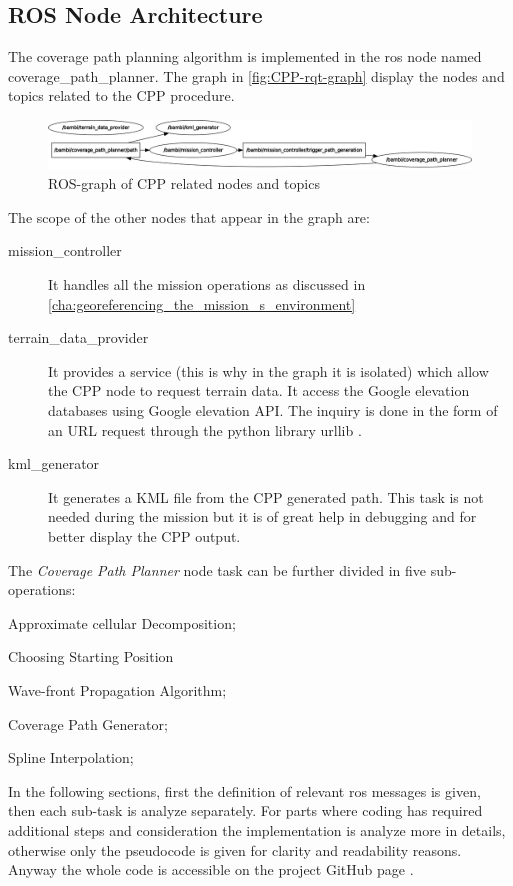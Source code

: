 \subsection{ROS Node Architecture} %
\label{sub:ros_node_architecture}
The coverage path planning algorithm is implemented in the \acrshort{ros} node named \textsf{coverage\_path\_planner}. The graph in \autoref{fig:CPP-rqt-graph} display the nodes and topics related to the CPP procedure.
\begin{figure}[ht]
    \centering
    \includegraphics[width=1\textwidth]{figures/C3/CPP-rqt-graph.png}
    \caption{ROS-graph of CPP related nodes and topics}
    \label{fig:CPP-rqt-graph}
\end{figure}
The scope of the other nodes that appear in the graph are:
\begin{description}
	\item[\textsf{mission\_controller}] It handles all the mission operations as discussed in \autoref{cha:georeferencing_the_mission_s_environment}
	\item[\textsf{terrain\_data\_provider}] It provides a service (this is why in the graph it is isolated) which allow the CPP node to request terrain data. It access the Google elevation databases using Google elevation API. The inquiry is done in the form of an URL request through the python library \textsf{urllib} \cite{urllib}. 
	\item[\textsf{kml\_generator}] It generates a KML file from the CPP generated path. This task is not needed during the mission but it is of great help in debugging and for better display the CPP output.
\end{description}
The \textit{Coverage Path Planner} node task can be further divided in five sub-operations:
\begin{enumerate*}[label={(\arabic*)}]
	\item Approximate cellular Decomposition;
	\item Choosing Starting Position
	\item Wave-front Propagation Algorithm;
	\item Coverage Path Generator;
	\item Spline Interpolation;
\end{enumerate*}
 In the following sections, first the definition of relevant \acrshort{ros} messages is given, then each sub-task is analyze separately. For parts where coding has required additional steps and consideration the implementation is analyze more in details, otherwise only the pseudocode is given for clarity and readability reasons. Anyway the whole code is accessible on the project GitHub page \cite{bambiProjectGit}.
